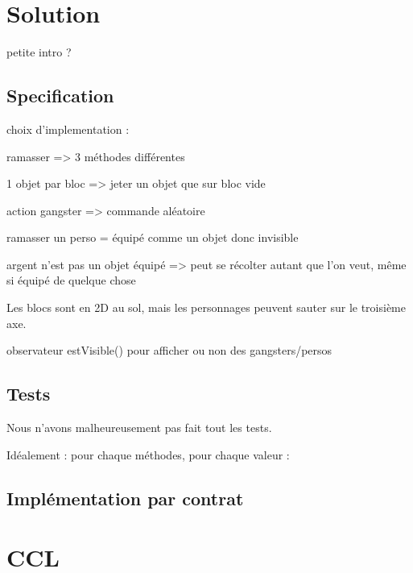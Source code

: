 \documentclass[a4paper, 11pt, notitlepage]{article}
\begin{document}


\section{Solution}
petite intro ?

\subsection{Specification}
choix d'implementation :

 ramasser => 3 méthodes différentes

 1 objet par bloc => jeter un objet que sur bloc vide

 action gangster => commande aléatoire

 ramasser un perso = équipé comme un objet donc invisible

 argent n’est pas un objet équipé  => peut se récolter autant que l’on
          veut, même si équipé de quelque chose

 Les blocs sont en 2D au sol, mais les personnages peuvent sauter sur
   le troisième axe.

 observateur estVisible() pour afficher ou non des gangsters/persos


\subsection{Tests}
Nous n'avons malheureusement pas fait tout les tests.

Idéalement : pour chaque méthodes, pour chaque valeur : 

\subsection{Implémentation par contrat}



\section*{CCL}

























\newpage
\pagestyle{empty}


\newpage
\pagestyle{empty}

\end{document}
